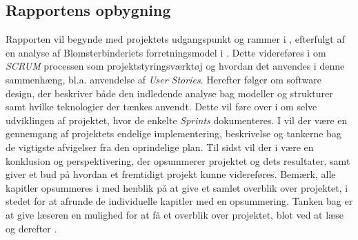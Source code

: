 \subsection{Rapportens opbygning}
Rapporten vil begynde med projektets udgangspunkt og rammer i , efterfulgt af en analyse af Blomsterbinderiets forretningsmodel i . 
Dette videreføres i  om \emph{SCRUM} processen som projektstyringsværktøj og hvordan det anvendes i denne sammenhæng, bl.a. anvendelse af \emph{User Stories}.
Herefter følger  om software design, der beskriver både den indledende analyse bag modeller og strukturer samt hvilke teknologier der tænkes anvendt.
Dette vil føre over i  om selve udviklingen af projektet, hvor de enkelte \emph{Sprints} dokumenteres. 
I  vil der være en gennemgang af projektets endelige implementering, beskrivelse og tankerne bag de vigtigste afvigelser fra den oprindelige plan.
Til sidst vil der i  være en konklusion og perspektivering, der opsummerer projektet og dets resultater, samt giver et bud på hvordan et fremtidigt projekt kunne videreføres.
Bemærk, alle kapitler opsummeres i  med henblik på at give et samlet overblik over projektet, i stedet for at afrunde de individuelle kapitler med en opsummering. 
Tanken bag er at give læseren en mulighed for at få et overblik over projektet, blot ved at læse  og derefter .

